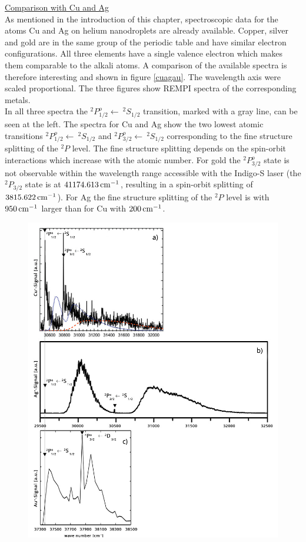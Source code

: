 \documentclass[parskip,12pt,headsepline,a4paper] {scrbook}
\begin{document}
\newpage
\underline{Comparison with Cu and Ag} \\
As mentioned in the introduction of this chapter, spectroscopic data for the atoms Cu and Ag on helium nanodroplets are already available. Copper, silver and gold are in the same group of the periodic table and have similar electron configurations. All three elements have a single valence electron which makes them comparable to the alkali atoms. A comparison of the available spectra is therefore interesting and shown in figure \ref{cuagau}. The wavelength axis were scaled proportional. The three figures show REMPI spectra of the corresponding metals. \\
In all three spectra the $^2P^o_{1/2} \leftarrow \ ^2S_{1/2}$ transition, marked with a gray line, can be seen at the left. The spectra for Cu and Ag show the two lowest atomic transitions $^2P^o_{1/2} \leftarrow \ ^2S_{1/2}$ and $^2P^o_{3/2} \leftarrow \ ^2S_{1/2}$ corresponding to the fine structure splitting of the $^2P$ level. The fine structure splitting depends on the spin-orbit interactions which increase with the atomic number. For gold the $^2P^o_{3/2}$ state is not observable within the wavelength range accessible with the Indigo-S laser (the $^2P_{3/2}$ state is at $\unit[41 174.613]{cm^{-1}}$, resulting in a spin-orbit splitting of $\unit[3815.622]{cm^{-1}}$). For Ag the fine structure splitting of the $^2P$ level is with $\unit[950]{cm^{-1}}$ larger than for Cu with $\unit[200]{cm^{-1}}$.

\begin{figure}[H]
\centerline{
\includegraphics[width=12cm]{./results/Cu_Ag_Au.jpg}}
\end{figure}
\end{document}

